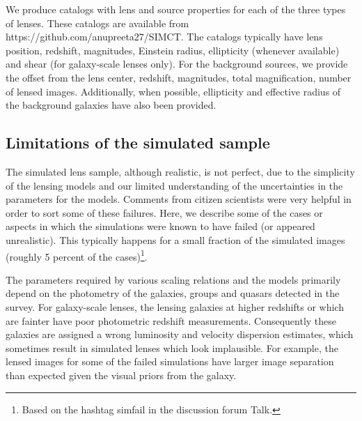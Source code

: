 \documentclass[useAMS,usenatbib,a4paper]{mn2e}
\begin{document}

We produce catalogs with lens and source properties for each of the three types
of lenses. These catalogs are available from
https://github.com/anupreeta27/SIMCT. The catalogs typically have lens
position, redshift, magnitudes, Einstein radius, ellipticity (whenever
available) and shear (for galaxy-scale lenses only). For the background
sources, we provide the offset from the lens center, redshift, magnitudes,
total magnification, number of lensed images. Additionally, when possible,
ellipticity and effective radius of the background galaxies have also been
provided.


\subsection{Limitations of the simulated sample}
The simulated lens sample, although realistic, is not perfect, due to the
simplicity of the lensing models and our limited understanding of the
uncertainties in the parameters for the models. Comments from citizen
scientists were very helpful in order to sort some of these failures. Here, we
describe some of the cases or aspects in which the simulations were known to
have failed (or appeared unrealistic). This typically happens for a small
fraction of the simulated images (roughly 5 percent of
the cases)\footnote{Based on the hashtag simfail in the discussion forum Talk.}.

The parameters required by various scaling relations and the models primarily
depend on the photometry of the galaxies, groups and quasars detected in the
survey. For galaxy-scale lenses, the lensing galaxies at higher redshifts or
which are fainter have poor photometric redshift measurements. Consequently
these galaxies are assigned a wrong luminosity and velocity dispersion
estimates, which sometimes result in simulated lenses which look implausible.
For example, the lensed images for some of the failed simulations have larger
image separation than expected given the visual priors from the galaxy.
\end{document}
